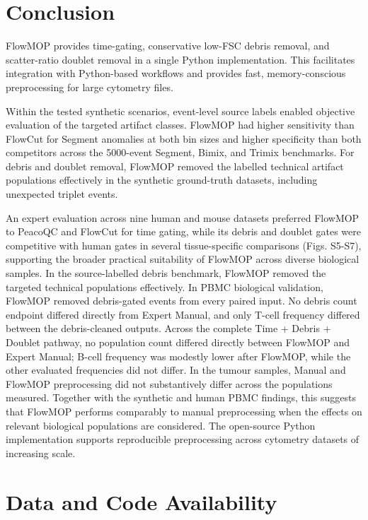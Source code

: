 \documentclass[ASNA]{latex/wiley/USG}
\begin{document}
\FloatBarrier

\section{Conclusion}\label{conclusion}

FlowMOP provides time-gating, conservative low-FSC debris removal, and
scatter-ratio doublet removal in a single Python implementation. This
facilitates integration with Python-based workflows and provides fast,
memory-conscious preprocessing for large cytometry files.

Within the tested synthetic scenarios, event-level source labels enabled
objective evaluation of the targeted artifact classes. FlowMOP had
higher sensitivity than FlowCut for Segment anomalies at both bin sizes
and higher specificity than both competitors across the 5000-event
Segment, Bimix, and Trimix benchmarks. For debris and doublet removal,
FlowMOP removed the labelled technical artifact populations effectively
in the synthetic ground-truth datasets, including unexpected triplet
events.

An expert evaluation across nine human and mouse datasets preferred
FlowMOP to PeacoQC and FlowCut for time gating, while its debris and
doublet gates were competitive with human gates in several
tissue-specific comparisons (Figs. S5-S7), supporting the broader
practical suitability of FlowMOP across diverse biological samples. In
the source-labelled debris benchmark, FlowMOP removed the targeted
technical populations effectively. In PBMC biological validation,
FlowMOP removed debris-gated events from every paired input. No debris
count endpoint differed directly from Expert Manual, and only T-cell
frequency differed between the debris-cleaned outputs. Across the
complete Time + Debris + Doublet pathway, no population count differed
directly between FlowMOP and Expert Manual; B-cell frequency was
modestly lower after FlowMOP, while the other evaluated frequencies did
not differ. In the tumour samples, Manual and FlowMOP preprocessing did
not substantively differ across the populations measured. Together with
the synthetic and human PBMC findings, this suggests that FlowMOP
performs comparably to manual preprocessing when the effects on relevant
biological populations are considered. The open-source Python
implementation supports reproducible preprocessing across cytometry
datasets of increasing scale.

\FloatBarrier

\section{Data and Code Availability}\label{data-and-code-availability}
\end{document}
